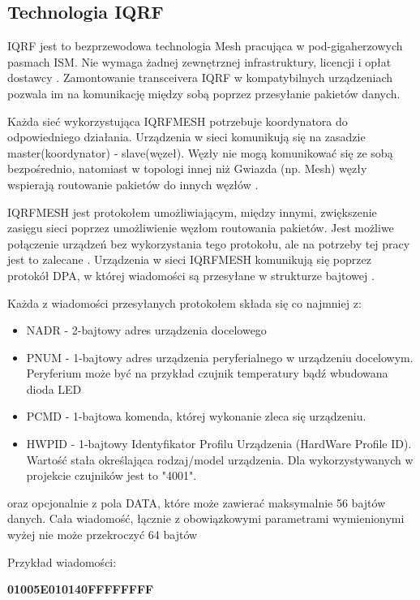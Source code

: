 \documentclass[a4paper, 12pt]{article}
\begin{document}
\subsection{Technologia IQRF}

IQRF jest to bezprzewodowa technologia Mesh pracująca w pod-gigaherzowych pasmach ISM. Nie wymaga żadnej zewnętrznej infrastruktury, 
licencji i opłat dostawcy \cite{what-iqrf}. Zamontowanie transceivera IQRF w kompatybilnych urządzeniach pozwala im na komunikację między sobą
poprzez przesyłanie pakietów danych. 

Każda sieć wykorzystująca IQRFMESH potrzebuje koordynatora do odpowiedniego działania. Urządzenia w sieci komunikują się na zasadzie
master(koordynator) - slave(węzeł). Węzły nie mogą komunikować się ze sobą bezpośrednio, natomiast w topologi innej niż
Gwiazda (np. Mesh) węzły wspierają routowanie pakietów do innych węzłów \cite{iqrf-rules}.

IQRFMESH jest protokołem umożliwiającym, między innymi, zwiększenie zasięgu sieci poprzez umożliwienie węzłom routowania pakietów.
Jest możliwe połączenie urządzeń bez wykorzystania tego protokołu, ale na potrzeby tej pracy jest to zalecane \cite{iqrfmesh}. Urządzenia w 
sieci IQRFMESH komunikują się poprzez protokół DPA, w której wiadomości są przesyłane w strukturze bajtowej \cite{dpa-guide}.

Każda z wiadomości przesyłanych protokołem składa się co najmniej z:
\begin{itemize}
    \item NADR - 2-bajtowy adres urządzenia docelowego
    \item PNUM - 1-bajtowy adres urządzenia peryferialnego w urządzeniu docelowym. Peryferium może być na przykład czujnik temperatury bądź wbudowana dioda LED
    \item PCMD - 1-bajtowa komenda, której wykonanie zleca się urządzeniu. 
    \item HWPID - 1-bajtowy Identyfikator Profilu Urządzenia (HardWare Profile ID). Wartość stała określająca rodzaj/model urządzenia. Dla wykorzystywanych w projekcie
czujników jest to "4001".
\end{itemize}

oraz opcjonalnie z pola DATA, które może zawierać maksymalnie 56 bajtów danych. Cała wiadomość, łącznie z obowiązkowymi parametrami wymienionymi wyżej nie może przekroczyć
64 bajtów 

Przykład wiadomości:

\begin{center}
    \textbf{01005E010140FFFFFFFF}
\end{center}
\end{document}
